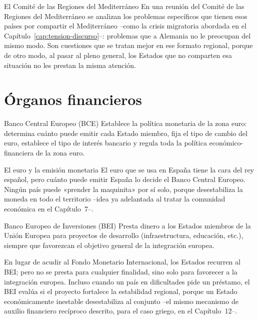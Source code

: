 \documentclass[12pt,oneside]{book}
\begin{document}
\begin{ejemplo}{El Comité de las Regiones del Mediterráneo}
En una reunión del Comité de las Regiones del Mediterráneo se analizan los problemas específicos que tienen esos países por compartir el Mediterráneo --como la crisis migratoria abordada en el Capítulo~\ref{cap:tension-discurso}--: problemas que a Alemania no le preocupan del mismo modo. Son cuestiones que se tratan mejor en ese formato regional, porque de otro modo, al pasar al pleno general, los Estados que no comparten esa situación no les prestan la misma atención.
\end{ejemplo}

\section{Órganos financieros}

\begin{definicion}{Banco Central Europeo (BCE)}
Establece la política monetaria de la zona euro: determina cuánto puede emitir cada Estado miembro, fija el tipo de cambio del euro, establece el tipo de interés bancario y regula toda la política económico-financiera de la zona euro.
\end{definicion}

\begin{ejemplo}{El euro y la emisión monetaria}
El euro que se usa en España tiene la cara del rey español, pero cuánto puede emitir España lo decide el Banco Central Europeo. Ningún país puede «prender la maquinita» por sí solo, porque desestabiliza la moneda en todo el territorio --idea ya adelantada al tratar la comunidad económica en el Capítulo~7--.
\end{ejemplo}

\begin{definicion}{Banco Europeo de Inversiones (BEI)}
Presta dinero a los Estados miembros de la Unión Europea para proyectos de desarrollo (infraestructura, educación, etc.), siempre que favorezcan el objetivo general de la integración europea.
\end{definicion}

En lugar de acudir al Fondo Monetario Internacional, los Estados recurren al BEI; pero no se presta para cualquier finalidad, sino solo para favorecer a la integración europea. Incluso cuando un país en dificultades pide un préstamo, el BEI evalúa si el proyecto fortalece la estabilidad regional, porque un Estado económicamente inestable desestabiliza al conjunto --el mismo mecanismo de auxilio financiero recíproco descrito, para el caso griego, en el Capítulo~12--.
\end{document}

